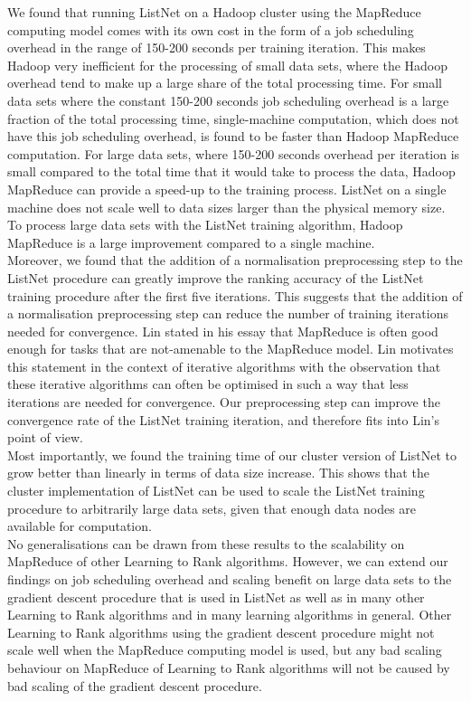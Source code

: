 We found that running ListNet on a Hadoop cluster using the MapReduce computing model comes with its own cost in the form of a job scheduling overhead in the range of 150-200 seconds per training iteration. This makes Hadoop very inefficient for the processing of small data sets, where the Hadoop overhead tend to make up a large share of the total processing time. For small data sets where the constant 150-200 seconds job scheduling overhead is a large fraction of the total processing time, single-machine computation, which does not have this job scheduling overhead, is found to be faster than Hadoop MapReduce computation. For large data sets, where 150-200 seconds overhead per iteration is small compared to the total time that it would take to process the data, Hadoop MapReduce can provide a speed-up to the training process. ListNet on a single machine does not scale well to data sizes larger than the physical memory size. To process large data sets with the ListNet training algorithm, Hadoop MapReduce is a large improvement compared to a single machine.\\

Moreover, we found that the addition of a normalisation preprocessing step to the ListNet procedure can greatly improve the ranking accuracy of the ListNet training procedure after the first five iterations. This suggests that the addition of a normalisation preprocessing step can reduce the number of training iterations needed for convergence. Lin stated in his essay \cite{Lin2013} that MapReduce is often good enough for tasks that are not-amenable to the MapReduce model. Lin motivates this statement in the context of iterative algorithms with the observation that these iterative algorithms can often be optimised in such a way that less iterations are needed for convergence. Our preprocessing step can improve the convergence rate of the ListNet training iteration, and therefore fits into Lin's point of view.\\

Most importantly, we found the training time of our cluster version of ListNet to grow better than linearly in terms of data size increase. This shows that the cluster implementation of ListNet can be used to scale the ListNet training procedure to arbitrarily large data sets, given that enough data nodes are available for computation.\\

No generalisations can be drawn from these results to the scalability on MapReduce of other Learning to Rank algorithms. However, we can extend our findings on job scheduling overhead and scaling benefit on large data sets to the gradient descent procedure that is used in ListNet as well as in many other Learning to Rank algorithms and in many learning algorithms in general. Other Learning to Rank algorithms using the gradient descent procedure might not scale well when the MapReduce computing model is used, but any bad scaling behaviour on MapReduce of Learning to Rank algorithms will not be caused by bad scaling of the gradient descent procedure.

